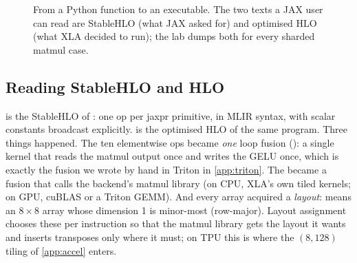 \begin{figure}[t]
\centering
{}
\caption{From a Python function to an executable. The two texts a JAX user can read are
StableHLO (what JAX asked for) and optimised HLO (what XLA decided to run); the lab dumps
both for every sharded matmul case.}
\label{fig:jax:pipeline}
\end{figure}

\subsection{Reading StableHLO and HLO}
 is the StableHLO of : one op per jaxpr
primitive, in MLIR syntax, with scalar constants broadcast explicitly.  is
the optimised HLO of the same program. Three things happened. The ten elementwise ops became
\emph{one} loop fusion (): a single kernel that reads the matmul output once
and writes the GELU once, which is exactly the fusion we wrote by hand in Triton in
\cref{app:triton}. The  became a  fusion that calls the backend's
matmul library (on CPU, XLA's own tiled kernels; on GPU, cuBLAS or a Triton GEMM). And every
array acquired a \emph{layout}:  means an $8\times8$ array whose
dimension 1 is minor-most (row-major). Layout assignment chooses these per instruction so
that the matmul library gets the layout it wants and inserts transposes only where it must;
on TPU this is where the $(8,128)$ tiling of \cref{app:accel} enters.

